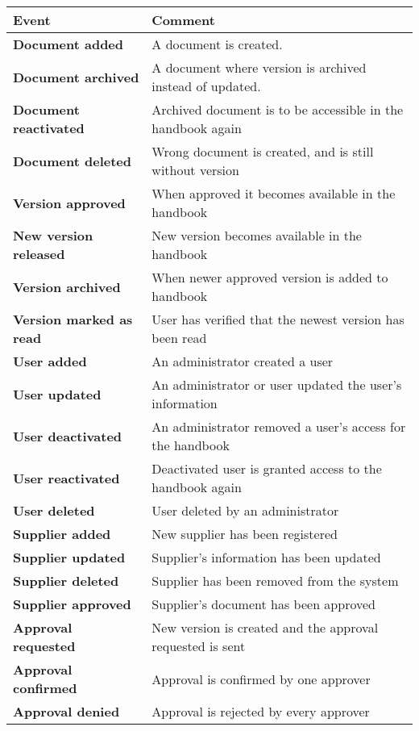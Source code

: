 \begin{table}[H]
	\begin{tabular}{m{} l}
		\hline
		Event & Comment\\
		\hline
		\textbf{Document added} & A document is created.\\
		\textbf{Document archived} & A document where version is archived instead of updated.\\
		\textbf{Document reactivated} & Archived document is to be accessible in the handbook again\\
		\textbf{Document deleted} & Wrong document is created, and is still without version\\
		\textbf{Version approved}  & When approved it becomes available in the handbook\\
		\textbf{New version released} &  New version becomes available in the handbook\\
		\textbf{Version archived} & When newer approved version is added to handbook\\
		\textbf{Version marked \newline as read} & User has verified that the newest version has been read\\
		\textbf{User added} & An administrator created a user\\
		\textbf{User updated} & An administrator or user updated the user's information\\
		\textbf{User deactivated} & An administrator removed a user's access for the handbook\\
		\textbf{User reactivated} & Deactivated user is granted access to the handbook again\\
		\textbf{User deleted} & User deleted by an administrator\\
		\textbf{Supplier added} & New supplier has been registered\\
		\textbf{Supplier updated} & Supplier's information has been updated\\
		\textbf{Supplier deleted} & Supplier has been removed from the system\\
		\textbf{Supplier approved} & Supplier's document has been approved\\
		\textbf{Approval requested} & New version is created and the approval requested is sent\\
		\textbf{Approval confirmed}
		& Approval is confirmed by one approver\\
		\textbf{Approval denied}
		& Approval is rejected by every approver\\

\end{tabular}
\end{table}
